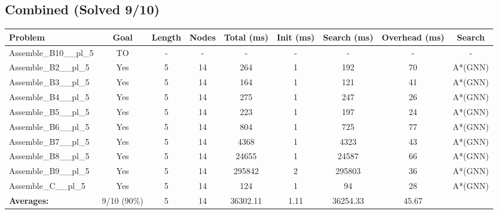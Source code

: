 \documentclass{article}
\begin{document}
\subsection*{Combined (Solved 9/10)}
\begin{tabular}{lcccccccc}
\toprule
Problem & Goal & Length & Nodes & Total (ms) & Init (ms) & Search (ms) & Overhead (ms) & Search \\
\midrule
Assemble\_B10\_\_pl\_5 & TO & - & - & - & - & - & - & - \\
Assemble\_B2\_\_pl\_5 & Yes & 5 & 14 & 264 & 1 & 192 & 70 & A*(GNN) \\
Assemble\_B3\_\_pl\_5 & Yes & 5 & 14 & 164 & 1 & 121 & 41 & A*(GNN) \\
Assemble\_B4\_\_pl\_5 & Yes & 5 & 14 & 275 & 1 & 247 & 26 & A*(GNN) \\
Assemble\_B5\_\_pl\_5 & Yes & 5 & 14 & 223 & 1 & 197 & 24 & A*(GNN) \\
Assemble\_B6\_\_pl\_5 & Yes & 5 & 14 & 804 & 1 & 725 & 77 & A*(GNN) \\
Assemble\_B7\_\_pl\_5 & Yes & 5 & 14 & 4368 & 1 & 4323 & 43 & A*(GNN) \\
Assemble\_B8\_\_pl\_5 & Yes & 5 & 14 & 24655 & 1 & 24587 & 66 & A*(GNN) \\
Assemble\_B9\_\_pl\_5 & Yes & 5 & 14 & 295842 & 2 & 295803 & 36 & A*(GNN) \\
Assemble\_C\_\_pl\_5 & Yes & 5 & 14 & 124 & 1 & 94 & 28 & A*(GNN) \\
\textbf{Averages:} & 9/10 (90\%) & 5 & 14 & 36302.11 & 1.11 & 36254.33 & 45.67 & \\
\bottomrule
\end{tabular}
\\[0.7cm]
\end{document}
